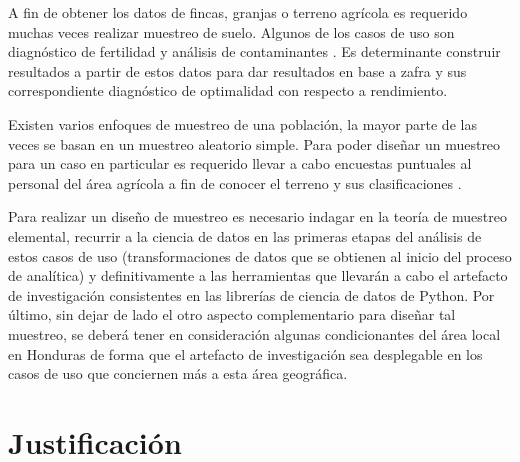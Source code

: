\documentclass{report}
\begin{document}
\bigbreak

A fin de obtener los datos de fincas, granjas o terreno agrícola es requerido muchas veces realizar muestreo de suelo. Algunos de los casos de uso son diagnóstico de fertilidad \cite{lassaga-2011} y análisis de contaminantes \cite{gobpe-ministerio-del-ambiente-2014}. Es determinante construir resultados a partir de estos datos para dar resultados en base a zafra y sus correspondiente diagnóstico de optimalidad con respecto a rendimiento.

\bigbreak

Existen varios enfoques de muestreo de una población, la mayor parte de las veces se basan en un muestreo aleatorio simple. Para poder diseñar un muestreo para un caso en particular es requerido llevar a cabo encuestas puntuales al personal del área agrícola a fin de conocer el terreno y sus clasificaciones \cite{organizacion-de-las-naciones-unidas-para-la-agricultura-y-la-alimentacion-1990}.

\bigbreak

Para realizar un diseño de muestreo es necesario indagar en la teoría de muestreo elemental, recurrir a la ciencia de datos en las primeras etapas del análisis de estos casos de uso (transformaciones de datos que se obtienen al inicio del proceso de analítica) y definitivamente a las herramientas que llevarán a cabo el artefacto de investigación consistentes en las librerías de ciencia de datos de Python. Por último, sin dejar de lado el otro aspecto complementario para diseñar tal muestreo, se deberá tener en consideración algunas condicionantes del área local en Honduras de forma que el artefacto de investigación sea desplegable en los casos de uso que conciernen más a esta área geográfica.

\section{Justificación}
\end{document}
